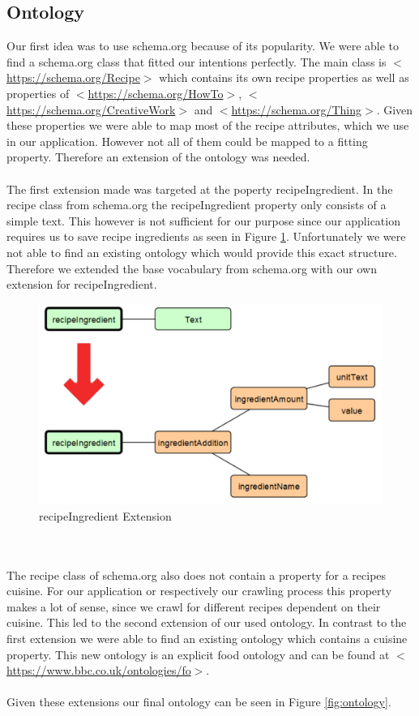 \documentclass{article}
\begin{document}
\subsection{Ontology}
Our first idea was to use schema.org because of its popularity. We were able to find a schema.org class that fitted our intentions perfectly. The main class is $<$\url{https://schema.org/Recipe}$>$ which contains its own recipe properties as well as properties of  $<$\url{https://schema.org/HowTo}$>$, $<$\url{https://schema.org/CreativeWork}$>$ and $<$\url{https://schema.org/Thing}$>$. Given these properties we were able to map most of the recipe attributes, which we use in our application. However not all of them could be mapped to a fitting property. Therefore an extension of the ontology was needed. \\ \\
The first extension made was targeted at the poperty recipeIngredient. In the recipe class from schema.org the recipeIngredient property only consists of a simple text. This however is not sufficient for our purpose since our application requires us to save recipe ingredients as seen in Figure \ref{fig:recipeIngredient}. Unfortunately we were not able to find an existing ontology which would provide this exact structure. Therefore we extended the base vocabulary from schema.org with our own extension for recipeIngredient. 
\begin{figure}[H]
  \centering
  \includegraphics[width=12cm]{pictures/recipeIngredient.png}
  \caption{recipeIngredient Extension}
  \label{fig:recipeIngredient}
\end{figure}
\noindent
\\ \\
The recipe class of schema.org also does not contain a property for a recipes cuisine. For our application or respectively our crawling process this property makes a lot of sense, since we crawl for different recipes dependent on their cuisine. This led to the second extension of our used ontology. In contrast to the first extension we were able to find an existing ontology which contains a cuisine property. This new ontology is an explicit food ontology and can be found at $<$\url{https://www.bbc.co.uk/ontologies/fo}$>$. \\ \\
Given these extensions our final ontology can be seen in Figure \ref{fig:ontology}.    
\end{document}
